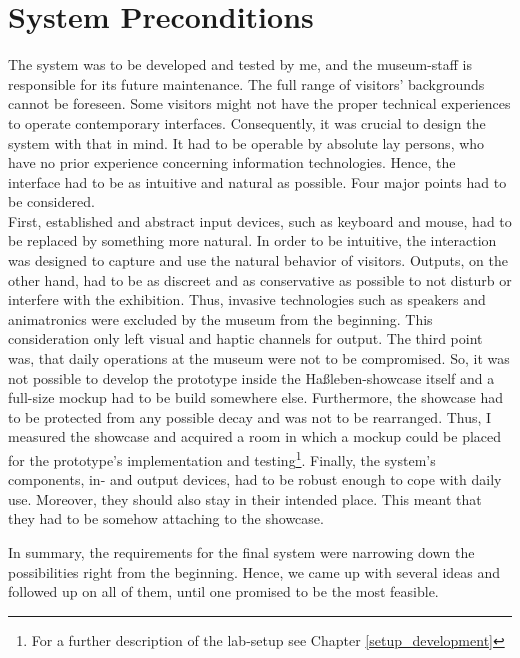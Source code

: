 
\section{System Preconditions}
\label{conception_system}

The system was to be developed and tested by me, and the museum-staff is responsible for its future maintenance. The full range of visitors' backgrounds cannot be foreseen. Some visitors might not have the proper technical experiences to operate contemporary interfaces. Consequently, it was crucial to design the system with that in mind. It had to be operable by absolute lay persons, who have no prior experience concerning information technologies. Hence, the interface had to be as intuitive and natural as possible. Four major points had to be considered.
\\
First, established and abstract input devices, such as keyboard and mouse, had to be replaced by something more natural. In order to be intuitive, the interaction was designed to capture and use the natural behavior of visitors. Outputs, on the other hand, had to be as discreet and as conservative as possible to not disturb or interfere with the exhibition. Thus, invasive technologies such as speakers and animatronics were excluded by the museum from the beginning. This consideration only left visual and haptic channels for output. The third point was, that daily operations at the museum were not to be compromised. So, it was not possible to develop the prototype inside the Haßleben-showcase itself and a full-size mockup had to be build somewhere else. Furthermore, the showcase had to be protected from any possible decay and was not to be rearranged. Thus, I measured the showcase and acquired a room in which a mockup could be placed for the prototype's implementation and testing\footnote{For a further description of the lab-setup see Chapter \ref{setup_development}}. Finally, the system's components, in- and output devices, had to be robust enough to cope with daily use. Moreover, they should also stay in their intended place. This meant that they had to be somehow attaching to the showcase.

In summary, the requirements for the final system were narrowing down the possibilities right from the beginning. Hence, we came up with several ideas and followed up on all of them, until one promised to be the most feasible.

